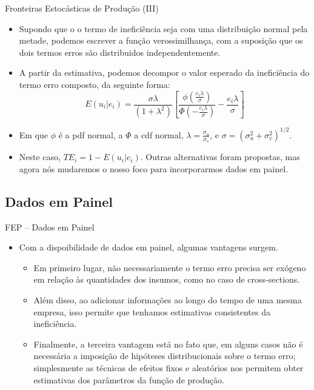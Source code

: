 \documentclass{beamer}
\begin{document}
\begin{frame}{Fronteiras Estocásticas de Produção (III)}

\begin{itemize}
\item Supondo que o o termo de ineficiência seja com uma distribuição normal
pela metade, podemos escrever a função verossimilhança, com a suposição
que os dois termos erros são distribuidos independentemente. 
\item A partir da estimativa, podemos decompor o valor esperado da ineficiência
do termo erro composto, da seguinte forma:
\[
E(u_{i}|e_{i})=\frac{\sigma\lambda}{(1+\lambda^{2})}\left[\frac{\phi(\frac{e_{i}\lambda}{\sigma})}{\Phi(-\frac{e_{i}\lambda}{\sigma})}-\frac{e_{i}\lambda}{\sigma}\right]
\]
\item Em que $\phi$ é a pdf normal, a $\Phi$ a cdf normal, $\lambda=\frac{\sigma_{u}}{\sigma_{v}}$,
e $\sigma=(\sigma_{u}^{2}+\sigma_{v}^{2})^{1/2}$. 
\item Neste caso, $TE_{i}=1-E(u_{i}|e_{i})$. Outras alternativas foram
propostas, mas agora nós mudaremos o nosso foco para incorporarmos
dados em painel. 
\end{itemize}
\end{frame}

\subsection{Dados em Painel}
\begin{frame}{FEP -- Dados em Painel}

\begin{itemize}
\item Com a dispoibilidade de dados em painel, algumas vantagens surgem.

\begin{itemize}
\item Em primeiro lugar, não necessariamente o termo erro precisa ser exógeno
em relação às quantidades dos insumos, como no caso de cross-sections. 
\item Além disso, ao adicionar informações ao longo do tempo de uma mesma
empresa, isso permite que tenhamos estimativas consistentes da ineficiência. 
\item Finalmente, a terceira vantagem está no fato que, em alguns casos
não é necessária a imposição de hipóteses distribucionais sobre o
termo erro; simplesmente as técnicas de efeitos fixos e aleatórios
nos permitem obter estimativas dos parâmetros da função de produção. 
\end{itemize}
\end{itemize}
\end{frame}
\end{document}
